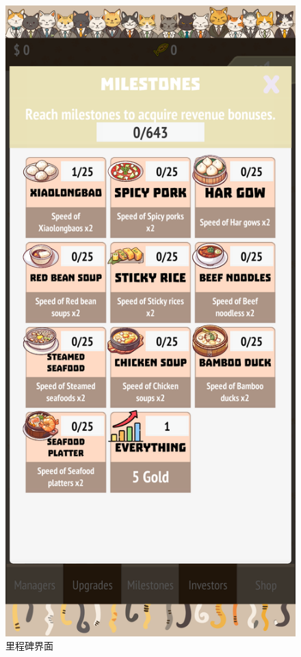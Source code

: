 \documentclass{mancls}%
\begin{document}
\begin{figure}[h]
  \centering
  \includegraphics[height=0.6\textheight]{screenshots/PurrfectEats_007.png}
  \caption{里程碑界面}
\end{figure}
\end{document}

